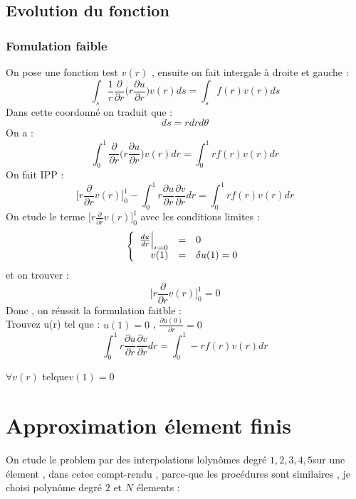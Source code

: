 \documentclass[a4paper,10pt]{report} %
\begin{document}
\section{Evolution du fonction}
\subsection{Fomulation faible}
On pose une fonction test $v(r)$ , ensuite on fait intergale à droite et gauche :
\begin{equation}
\int_s\frac{1}{r}\frac{\partial}{\partial r}\Big(r\frac{\partial u}{\partial r}\Big)v(r)ds=\int_sf(r)v(r)ds
\end{equation}
Dans cette coordonné on traduit que :
$$ds= rdrd\theta$$
On a :
\begin{equation}
\int_0^1\frac{\partial}{\partial r}\Big(r\frac{\partial u}{\partial r}\Big)v(r)dr=\int_0^1rf(r)v(r)dr
\end{equation}
On fait IPP :
\begin{equation}
\Big[r\frac{\partial}{\partial r}v(r)\Big]_0^1-\int_0^1r\frac{\partial u}{\partial r}\frac{\partial v}{\partial r}dr=\int_0^1rf(r)v(r)dr
\end{equation}
On etude le terme $\Big[r\frac{\partial}{\partial r}v(r)\Big]_0^1$ avec les conditions limites :
$$
\left\{
\begin{array}{r c l}
\frac{du}{dr}\Big|_{r=0}&=&0\\v(1)&=&\delta u(1)=0
\end{array}
\right.
$$
et on trouver :
\begin{equation}
\Big[r\frac{\partial}{\partial r}v(r)\Big]_0^1=0
\end{equation}
Donc , on réussit la formulation faitble :\\

Trouvez u(r) tel que : $u(1)=0$ , $\frac{\partial u(0)}{\partial r}=0$
\begin{equation}
\int_0^1r\frac{\partial u}{\partial r}\frac{\partial v}{\partial r}dr=\int_0^1-rf(r)v(r)dr
\end{equation}

$\forall v(r) $ telque$v(1)=0$
\chapter{Approximation élement finis}
On etude le problem par des interpolations lolynômes degré $1, 2 ,3 ,4 ,5 $sur une élement , dans cetee compt-rendu , parce-que les procédures sont similaires , je choisi polynôme degré $2$ et $N$ élements : 
\end{document}

